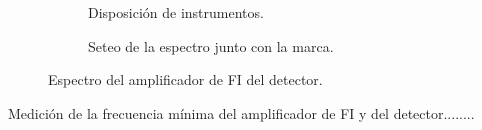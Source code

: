     \begin{figure}[H]
      \centering
      \begin{subfigure}[ht]{0.48\textwidth}
        \caption{Disposición de instrumentos.}
        \label{fig:InstrumentosParaFI}
      \end{subfigure}
      \hfill 
      \begin{subfigure}[ht]{0.48\textwidth}
        \caption{Seteo de la espectro junto con la marca.}
        \label{fig:EspectroaFI}
      \end{subfigure}

      \caption{Espectro del amplificador de FI del detector.}
      \label{fig:MediccionEspectroFIDetector}
    \end{figure}

    Medición de la frecuencia mínima del amplificador de FI y del detector........

